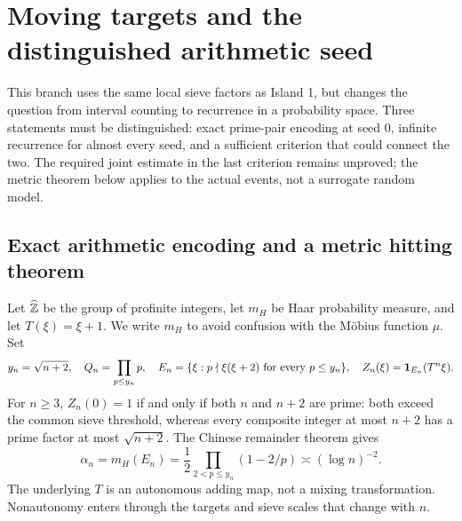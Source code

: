 \section{Moving targets and the distinguished arithmetic seed}\label{sec:dynamics}
This branch uses the same local sieve factors as Island 1, but changes the question from interval counting to recurrence in a probability space. Three statements must be distinguished: exact prime-pair encoding at seed $0$, infinite recurrence for almost every seed, and a sufficient criterion that could connect the two. The required joint estimate in the last criterion remains unproved; the metric theorem below applies to the actual events, not a surrogate random model.
\subsection{Exact arithmetic encoding and a metric hitting theorem}
Let $\widehat{\mathbb Z}$ be the group of profinite integers, let $m_H$ be Haar probability measure, and let $T(\xi)=\xi+1$.
We write $m_H$ to avoid confusion with the M\"obius function $\mu$. Set
\[
y_n=\sqrt{n+2},\quad Q_n=\prod_{p\le y_n}p,\quad
E_n=\{\xi:p\nmid\xi(\xi+2)\text{ for every }p\le y_n\},\quad
Z_n(\xi)=\mathbf 1_{E_n}(T^n\xi).
\]
For $n\ge3$, $Z_n(0)=1$ if and only if both $n$ and $n+2$ are prime: both exceed the common sieve threshold, whereas every composite integer at most $n+2$ has a prime factor at most $\sqrt{n+2}$.
The Chinese remainder theorem gives
\[
\alpha_n=m_H(E_n)=\frac12\prod_{2<p\le y_n}(1-2/p)\asymp(\log n)^{-2}.
\]
The underlying $T$ is an autonomous adding map, not a mixing transformation. Nonautonomy enters through the targets and sieve scales that change with $n$.

